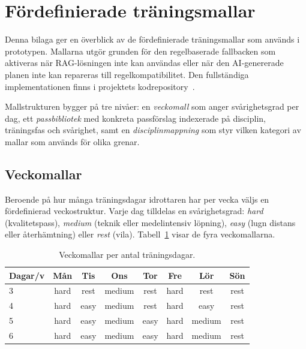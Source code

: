 
\section{Fördefinierade träningsmallar}
\label{app:mallar}

Denna bilaga ger en överblick av de fördefinierade träningsmallar som används
i prototypen. Mallarna utgör grunden för den regelbaserade fallbacken som
aktiveras när RAG-lösningen inte kan användas eller när den AI-genererade
planen inte kan repareras till regelkompatibilitet. Den fullständiga
implementationen finns i projektets kodrepository~\cite{Boissier_AI-baserat_traningsstod_for}.

Mallstrukturen bygger på tre nivåer: en \emph{veckomall} som anger
svårighetsgrad per dag, ett \emph{passbibliotek} med konkreta passförslag
indexerade på disciplin, träningsfas och svårighet, samt en \emph{disciplinmappning}
som styr vilken kategori av mallar som används för olika grenar.

\subsection{Veckomallar}
\label{app:mallar:vecka}

Beroende på hur många träningsdagar idrottaren har per vecka väljs en
fördefinierad veckostruktur. Varje dag tilldelas en svårighetsgrad:
\textit{hard} (kvalitetspass), \textit{medium} (teknik eller medelintensiv
löpning), \textit{easy} (lugn distans eller återhämtning) eller \textit{rest}
(vila). Tabell~\ref{tab:veckomallar} visar de fyra veckomallarna.

\begin{table}[h]
\centering
\caption{Veckomallar per antal träningsdagar.}
\label{tab:veckomallar}
\small
\begin{tabular}{l c c c c c c c}
\hline
\textbf{Dagar/v} & \textbf{Mån} & \textbf{Tis} & \textbf{Ons} & \textbf{Tor} & \textbf{Fre} & \textbf{Lör} & \textbf{Sön} \\
\hline
3 & hard   & rest   & medium & rest & hard & rest   & rest \\
4 & hard   & easy   & medium & rest & hard & easy   & rest \\
5 & hard   & easy   & medium & easy & hard & medium & rest \\
6 & hard   & easy   & medium & easy & hard & medium & rest \\
\hline
\end{tabular}
\end{table}

